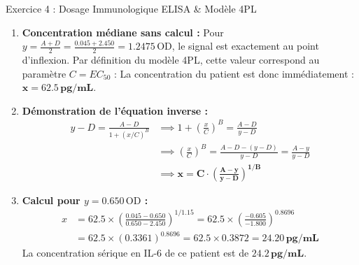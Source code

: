 \documentclass[11pt,a4paper]{article}
\begin{document}
\begin{solutionbox}{Exercice 4 : Dosage Immunologique ELISA \& Modèle 4PL}
\begin{enumerate}[label=\textbf{\alph*.}]
  \item \textbf{Concentration médiane sans calcul :}
  Pour $y = \frac{A + D}{2} = \frac{0.045 + 2.450}{2} = 1.2475\,\text{OD}$, le signal est exactement au point d'inflexion. Par définition du modèle 4PL, cette valeur correspond au paramètre $C = EC_{50}$ :
  La concentration du patient est donc immédiatement : $\mathbf{x = 62.5\,\text{pg/mL}}$.

  \item \textbf{Démonstration de l'équation inverse :}
  \begin{align*}
    y - D = \frac{A - D}{1 + (x/C)^B} &\implies 1 + \left(\frac{x}{C}\right)^B = \frac{A - D}{y - D} \\
    &\implies \left(\frac{x}{C}\right)^B = \frac{A - D - (y - D)}{y - D} = \frac{A - y}{y - D} \\
    &\implies \mathbf{x = C \cdot \left(\frac{A - y}{y - D}\right)^{1/B}}
  \end{align*}

  \item \textbf{Calcul pour $y = 0.650\,\text{OD}$ :}
  \begin{align*}
    x &= 62.5 \times \left( \frac{0.045 - 0.650}{0.650 - 2.450} \right)^{1/1.15} = 62.5 \times \left( \frac{-0.605}{-1.800} \right)^{0.8696} \\
    &= 62.5 \times (0.3361)^{0.8696} = 62.5 \times 0.3872 = \mathbf{24.20\,\text{pg/mL}}
  \end{align*}
  La concentration sérique en IL-6 de ce patient est de $\mathbf{24.2\,\text{pg/mL}}$.
\end{enumerate}
\end{solutionbox}
\end{document}
